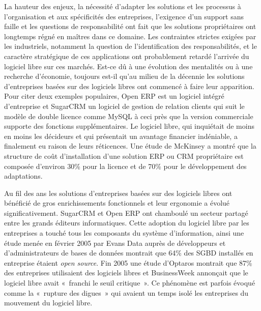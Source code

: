 \documentclass{FramateX}
\begin{document}
\begin{refsection}
La hauteur des enjeux, la nécessité d'adapter les solutions et les
processus à l'organisation et aux spécificités des entreprises,
l'exigence d'un support sans faille et les questions de responsabilité
ont fait que les solutions propriétaires ont longtemps régné en maîtres
dans ce domaine. Les contraintes strictes exigées par les industriels,
notamment la question de l'identification des
responsabilités, et le caractère stratégique de ces applications ont
probablement retardé l'arrivée du logiciel libre sur ces marchés.
Est-ce dû à une évolution des mentalités ou à une recherche d'économie,
toujours est-il qu'au milieu de la décennie les solutions d'entreprises
basées sur des logiciels libres ont commencé à faire leur apparition.
Pour citer deux exemples populaires, Open ERP est un logiciel intégré
d'entreprise et SugarCRM un logiciel de gestion de relation clients qui
suit le modèle de double licence comme MySQL à ceci près que la version
commerciale supporte des fonctions supplémentaires. Le logiciel libre,
qui inquiétait de moins en moins les décideurs et qui présentait un
avantage financier indéniable, a finalement eu raison de leurs
réticences. Une étude de McKinsey a montré que la structure de coût
d'installation d'une solution ERP ou
CRM propriétaire est composée d'environ 30\% pour la licence et de
70\% pour le développement des adaptations.

Au fil des ans les solutions d'entreprises basées sur
des logiciels libres ont bénéficié de gros enrichissements fonctionnels
et leur ergonomie a évolué significativement. SugarCRM et Open ERP ont
chamboulé un secteur partagé entre les grands éditeurs informatiques.
Cette adoption du logiciel libre par les entreprises a touché tous les
composants du système d'information, ainsi une étude menée en février
2005 par Evans Data auprès de développeurs et d'administrateurs de
bases de données montrait que 64\% des SGBD installés en entreprise
étaient \textit{open source}. Fin 2005 une étude d'Optaros montrait que
87\% des entreprises utilisaient des logiciels libres et BusinessWeek
annonçait que le logiciel libre avait «~franchi le seuil critique~». Ce
phénomène est parfois évoqué comme la «~rupture des digues~» qui
avaient un temps isolé les entreprises du mouvement du logiciel libre.


\end{refsection}
\end{document}
